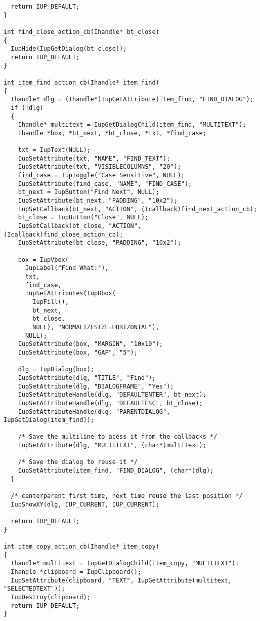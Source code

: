 \documentclass{ctexart}
\begin{document}
\begin{lstlisting}
  return IUP_DEFAULT;
}

int find_close_action_cb(Ihandle* bt_close)
{
  IupHide(IupGetDialog(bt_close));
  return IUP_DEFAULT;
}

int item_find_action_cb(Ihandle* item_find)
{
  Ihandle* dlg = (Ihandle*)IupGetAttribute(item_find, "FIND_DIALOG");
  if (!dlg)
  {
    Ihandle* multitext = IupGetDialogChild(item_find, "MULTITEXT");
    Ihandle *box, *bt_next, *bt_close, *txt, *find_case;

    txt = IupText(NULL);
    IupSetAttribute(txt, "NAME", "FIND_TEXT");
    IupSetAttribute(txt, "VISIBLECOLUMNS", "20");
    find_case = IupToggle("Case Sensitive", NULL);
    IupSetAttribute(find_case, "NAME", "FIND_CASE");
    bt_next = IupButton("Find Next", NULL);
    IupSetAttribute(bt_next, "PADDING", "10x2");
    IupSetCallback(bt_next, "ACTION", (Icallback)find_next_action_cb);
    bt_close = IupButton("Close", NULL);
    IupSetCallback(bt_close, "ACTION", (Icallback)find_close_action_cb);
    IupSetAttribute(bt_close, "PADDING", "10x2");

    box = IupVbox(
      IupLabel("Find What:"),
      txt,
      find_case,
      IupSetAttributes(IupHbox(
        IupFill(),
        bt_next,
        bt_close,
        NULL), "NORMALIZESIZE=HORIZONTAL"),
      NULL);
    IupSetAttribute(box, "MARGIN", "10x10");
    IupSetAttribute(box, "GAP", "5");

    dlg = IupDialog(box);
    IupSetAttribute(dlg, "TITLE", "Find");
    IupSetAttribute(dlg, "DIALOGFRAME", "Yes");
    IupSetAttributeHandle(dlg, "DEFAULTENTER", bt_next);
    IupSetAttributeHandle(dlg, "DEFAULTESC", bt_close);
    IupSetAttributeHandle(dlg, "PARENTDIALOG", IupGetDialog(item_find));

    /* Save the multiline to acess it from the callbacks */
    IupSetAttribute(dlg, "MULTITEXT", (char*)multitext);

    /* Save the dialog to reuse it */
    IupSetAttribute(item_find, "FIND_DIALOG", (char*)dlg);
  }

  /* centerparent first time, next time reuse the last position */
  IupShowXY(dlg, IUP_CURRENT, IUP_CURRENT);

  return IUP_DEFAULT;
}

int item_copy_action_cb(Ihandle* item_copy) 
{
  Ihandle* multitext = IupGetDialogChild(item_copy, "MULTITEXT");
  Ihandle *clipboard = IupClipboard();
  IupSetAttribute(clipboard, "TEXT", IupGetAttribute(multitext, "SELECTEDTEXT"));
  IupDestroy(clipboard);
  return IUP_DEFAULT;
}


\end{lstlisting}
\end{document}
